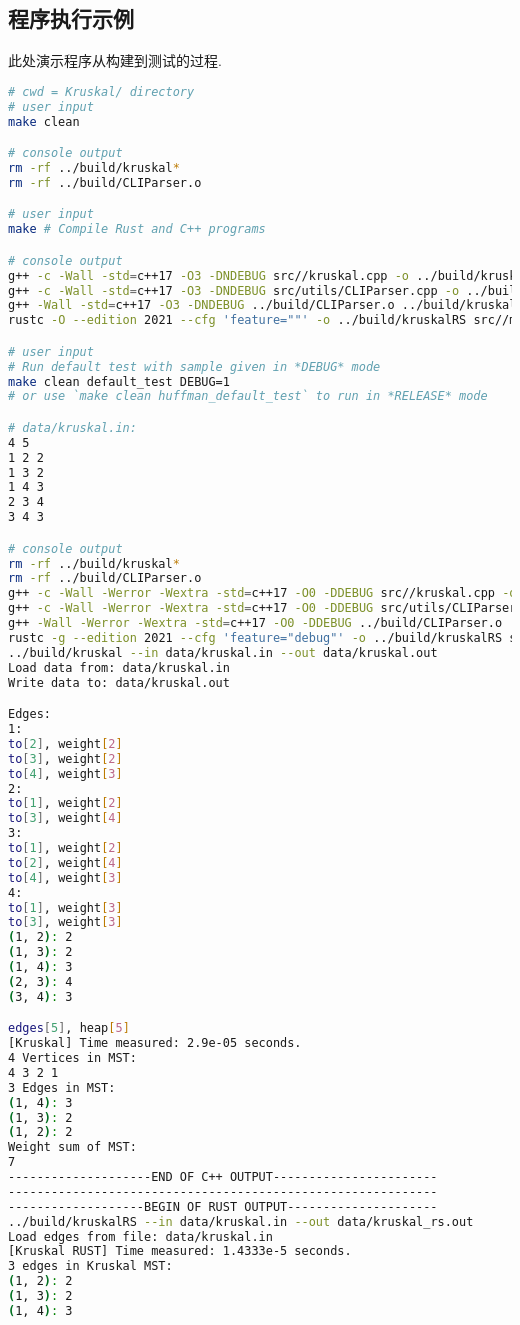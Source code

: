 \subsection{程序执行示例}
此处演示程序从构建到测试的过程.
\begin{lstlisting}[language=bash]
# cwd = Kruskal/ directory
# user input
make clean

# console output
rm -rf ../build/kruskal*
rm -rf ../build/CLIParser.o

# user input
make # Compile Rust and C++ programs

# console output
g++ -c -Wall -std=c++17 -O3 -DNDEBUG src//kruskal.cpp -o ../build/kruskal.o
g++ -c -Wall -std=c++17 -O3 -DNDEBUG src/utils/CLIParser.cpp -o ../build/CLIParser.o
g++ -Wall -std=c++17 -O3 -DNDEBUG ../build/CLIParser.o ../build/kruskal.o -o ../build/kruskal
rustc -O --edition 2021 --cfg 'feature=""' -o ../build/kruskalRS src//main.rs

# user input
# Run default test with sample given in *DEBUG* mode
make clean default_test DEBUG=1
# or use `make clean huffman_default_test` to run in *RELEASE* mode

# data/kruskal.in:
4 5
1 2 2
1 3 2
1 4 3
2 3 4
3 4 3

# console output
rm -rf ../build/kruskal*
rm -rf ../build/CLIParser.o
g++ -c -Wall -Werror -Wextra -std=c++17 -O0 -DDEBUG src//kruskal.cpp -o ../build/kruskal.o
g++ -c -Wall -Werror -Wextra -std=c++17 -O0 -DDEBUG src/utils/CLIParser.cpp -o ../build/CLIParser.o
g++ -Wall -Werror -Wextra -std=c++17 -O0 -DDEBUG ../build/CLIParser.o ../build/kruskal.o -o ../build/kruskal
rustc -g --edition 2021 --cfg 'feature="debug"' -o ../build/kruskalRS src//main.rs
../build/kruskal --in data/kruskal.in --out data/kruskal.out
Load data from: data/kruskal.in
Write data to: data/kruskal.out

Edges:
1:
to[2], weight[2]
to[3], weight[2]
to[4], weight[3]
2:
to[1], weight[2]
to[3], weight[4]
3:
to[1], weight[2]
to[2], weight[4]
to[4], weight[3]
4:
to[1], weight[3]
to[3], weight[3]
(1, 2): 2
(1, 3): 2
(1, 4): 3
(2, 3): 4
(3, 4): 3

edges[5], heap[5]
[Kruskal] Time measured: 2.9e-05 seconds.
4 Vertices in MST:
4 3 2 1
3 Edges in MST:
(1, 4): 3
(1, 3): 2
(1, 2): 2
Weight sum of MST:
7
--------------------END OF C++ OUTPUT-----------------------
------------------------------------------------------------
-------------------BEGIN OF RUST OUTPUT---------------------
../build/kruskalRS --in data/kruskal.in --out data/kruskal_rs.out
Load edges from file: data/kruskal.in
[Kruskal RUST] Time measured: 1.4333e-5 seconds.
3 edges in Kruskal MST:
(1, 2): 2
(1, 3): 2
(1, 4): 3


\end{lstlisting}
